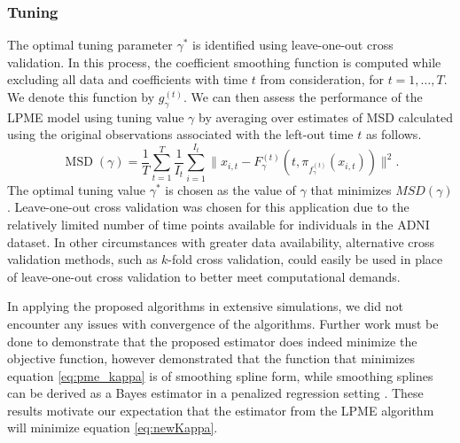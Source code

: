 \documentclass[12pt]{article}
\theoremstyle{definition}
\begin{document}

\subsubsection{Tuning}

The optimal tuning parameter $\gamma^*$ is identified using leave-one-out cross validation. In this process, the coefficient smoothing function is computed while excluding all data and coefficients with time $t$ from consideration, for $t = 1, \dots, T$. We denote this function by $g_{\gamma}^{(t)}$. We can then assess the performance of the LPME model using tuning value $\gamma$ by averaging over estimates of MSD calculated using the original observations associated with the left-out time $t$ as follows.
\begin{equation}
  \operatorname{MSD}(\gamma) = \frac{1}{T} \sum_{t=1}^{T}\frac{1}{I_t}\sum_{i=1}^{I_t}\|x_{i, t} - F_{\gamma}^{(t)}(t, \pi_{f_{\gamma}^{(t)}}(x_{i, t}))\|^2. \label{eq:18}
\end{equation}
The optimal tuning value $\gamma^*$ is chosen as the value of $\gamma$ that minimizes $MSD(\gamma)$. Leave-one-out cross validation was chosen for this application due to the relatively limited number of time points available for individuals in the ADNI dataset. In other circumstances with greater data availability, alternative cross validation methods, such as $k$-fold cross validation, could easily be used in place of leave-one-out cross validation to better meet computational demands.

In applying the proposed algorithms in extensive simulations, we did not encounter any issues with convergence of the algorithms. Further work must be done to demonstrate that the proposed estimator does indeed minimize the objective function, however \cite{mengPrincipalManifoldEstimation2021} demonstrated that the function that minimizes equation \eqref{eq:pme_kappa} is of smoothing spline form, while smoothing splines can be derived as a Bayes estimator in a penalized regression setting \citep{wahba1990}. These results motivate our expectation that the estimator from the LPME algorithm will minimize equation \eqref{eq:newKappa}.
\end{document}
